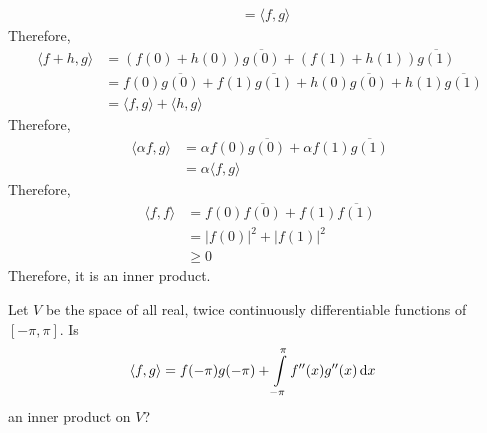 \documentclass[fleqn, a4paper, 11pt, oneside]{amsart}
\theoremstyle{definition}
\theoremstyle{theorem}
\begin{document}
\begin{solution}
\begin{enumerate}
\begin{align*}
                                                               & = \langle f,g \rangle
			\end{align*}
			Therefore,
			\begin{align*}
				\langle f + h , g \rangle & = \left( f(0) + h(0) \right) \overline{g(0)} + \left( f(1) + h(1) \right) \overline{g(1)}   \\
                                                          & = f(0) \overline{g(0)} + f(1) \overline{g(1)} + h(0) \overline{g(0)} + h(1) \overline{g(1)} \\
                                                          & = \langle f,g \rangle + \langle h,g \rangle
			\end{align*}
			Therefore,
			\begin{align*}
				\langle \alpha f , g \rangle & = \alpha f(0) \overline{g(0)} + \alpha f(1) \overline{g(1)} \\
                                                             & = \alpha \langle f,g \rangle
			\end{align*}
			Therefore,
			\begin{align*}
				\langle f,f \rangle & = f(0) \overline{f(0)} + f(1) \overline{f(1)}   \\
                                                    & = \left| f(0) \right|^2 + \left| f(1) \right|^2 \\
                                                    & \ge 0
			\end{align*}
			Therefore, it is an inner product.
	\end{enumerate}
\end{solution}

\begin{question}
	Let $V$ be the space of all real, twice continuously differentiable functions of $[-\pi,\pi]$.
	Is
	\begin{align*}
		\langle f,g \rangle & = f(-\pi) g(-\pi) + \int\limits_{-\pi}^{\pi} f''(x) g''(x) \dif x
	\end{align*}
	an inner product on $V$?
\end{question}
\end{document}
